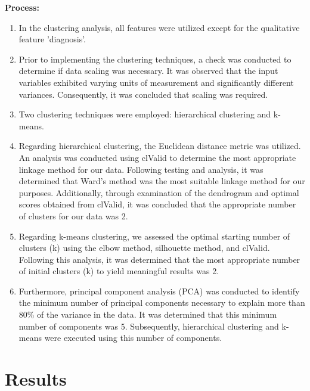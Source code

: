\documentclass[conference]{IEEEtran}
\begin{document}
\vspace{0.2cm}
\textbf{Process:}
\vspace{0.2cm}
\begin{enumerate}
    \item In the clustering analysis, all features were utilized except for the qualitative feature 'diagnosis'.
    
    \item Prior to implementing the clustering techniques, a check was conducted to determine if data scaling was necessary. It was observed that the input variables exhibited varying units of measurement and significantly different variances. Consequently, it was concluded that scaling was required.
    
    \item Two clustering techniques were employed: hierarchical clustering and k-means.
    
    \item Regarding hierarchical clustering, the Euclidean distance metric was utilized. An analysis was conducted using clValid to determine the most appropriate linkage method for our data. Following testing and analysis, it was determined that Ward's method was the most suitable linkage method for our purposes. Additionally, through examination of the dendrogram and optimal scores obtained from clValid, it was concluded that the appropriate number of clusters for our data was 2.
    
    \item Regarding k-means clustering, we assessed the optimal starting number of clusters (k) using the elbow method, silhouette method, and clValid. Following this analysis, it was determined that the most appropriate number of initial clusters (k) to yield meaningful results was 2.
    
    \item Furthermore, principal component analysis (PCA) was conducted to identify the minimum number of principal components necessary to explain more than 80\% of the variance in the data. It was determined that this minimum number of components was 5. Subsequently, hierarchical clustering and k-means were executed using this number of components.
    
\end{enumerate}
\section{{Results}}
\vspace{0.2cm}
\end{document}
